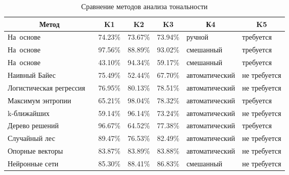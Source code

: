 \clearpage
\noindent
\captionsetup{format=hang,justification=raggedright,
              singlelinecheck=off,width=16.8cm}
\begin{longtable}[Hc]{|p{3.2cm}|p{1.5cm}|p{1.5cm}|p{1.5cm}|p{3.5cm}|p{3cm}|}
\caption{Сравнение методов анализа тональности\label{tab:02}}\\
    \hline
    \multicolumn{1}{|c}{\textbf{Метод}} & \multicolumn{1}{|c|}{\textbf{K1}} &
    \multicolumn{1}{c|}{\textbf{K2}} & \multicolumn{1}{c}{\textbf{K3}} &
    \multicolumn{1}{|c|}{\textbf{К4}} & \multicolumn{1}{c|}{\textbf{K5}}\\
    \hline
    \mbox{На~основе}
    ~\cite{article18}    & 74.23\% & 73.67\% & 73.94\%
                                     & ручной & требуется \\*
    \hline
    \mbox{На~основе}
    ~\cite{article18}  & 97.56\% & 88.89\% & 93.02\%
                                     & смешанный & требуется\\*
    \hline
    \mbox{На~основе}
    ~\cite{article18}  & 43.10\% & 94.34\% & 59.17\%
                                     & смешанный & требуется\\*
    \hline
    Наивный\linebreak
    Байес~\cite{article18}               & 75.49\% & 52.44\% & 67.70\%
                                     & автоматический & не требуется\\*
    \hline
    Логистическая
    регрессия ~\cite{article18}          & 76.95\% & 80.13\% & 78.51\%
                                     & автоматический & не требуется\\
    \hline
    Максимум\linebreak
    энтропии~\cite{article18}            & 65.21\% & 98.04\% & 78.32\%
                                     & автоматический & требуется\\
    \hline
    k-ближайших
    ~\cite{article18}   & 59.14\% & 96.14\% & 73.24\%
                                     & автоматический & не требуется\\
    \hline
    Дерево\linebreak
    решений~\cite{article18}             & 96.67\% & 64.52\% & 77.38\%
                                     & автоматический & требуется\\
    \hline
    Случайный лес~\cite{article18}       & 89.47\% & 76.53\% & 82.49\%
                                     & автоматический & не требуется\\
    \hline
    Опорные\linebreak
    векторы~\cite{article18}             & 83.87\% & 83.89\% & 83.88\%
                                     & автоматический & не требуется\\
    \hline
    Нейронные\linebreak
    сети~\cite{article18}                & 85.30\% & 88.41\% & 86.83\%
                                     & смешанный & не требуется \\
    \hline
\end{longtable}

